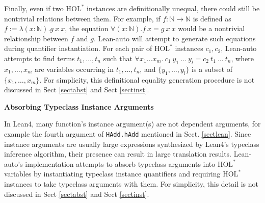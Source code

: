   Finally, even if two $\text{HOL}^*$ instances are definitionally unequal, there could still be nontrivial
relations between them. For example, if $f : \mathbb{N} \to \mathbb{N}$ is defined as
$f := \lambda (x : \mathbb{N}). g \ x \ x$, the equation $\forall (x : \mathbb{N}). f \ x = g \ x \ x$
would be a nontrivial relationship between $f$ and $g$. Lean-auto will attempt
to generate such equations during quantifier instantiation. For each pair of $\text{HOL}^*$ instances $c_1, c_2$,
Lean-auto attempts to find terms $t_1, \dots, t_n$ such that $\forall x_1 \dots x_m. \ c_1 \ y_1 \ \dots \ y_l = c_2 \ t_1 \ \dots \ t_n$,
where $x_1, \dots, x_m$ are variables occurring in $t_1, \dots, t_n$, and
$\{y_1, \dots, y_l\}$ is a subset of $\{x_1, \dots, x_m\}$. For simplicity, this
definitional equality generation procedure is not discussed in Sect \ref{sectabst} and Sect \ref{sectinst}.

\noindent \textbf{Absorbing Typeclass Instance Arguments}

  In Lean4, many function's instance argument(s) are not dependent arguments,
for example the fourth argument of \texttt{HAdd.hAdd} mentioned in Sect. \ref{sectlean}.
Since instance arguments are usually large expressions synthesized by Lean4's typeclass
inference algorithm, their presence can result in large translation results.
Lean-auto's implementation attempts to absorb typeclass arguments into
$\text{HOL}^*$ variables by instantiating typeclass instance quantifiers
and requiring $\text{HOL}^*$ instances to take typeclass arguments with them. For
simplicity, this detail is not discussed in Sect \ref{sectabst} and Sect \ref{sectinst}.
